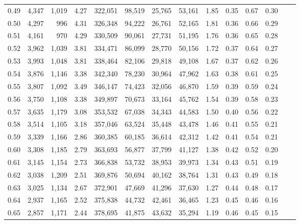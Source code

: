 \begin{tabular}{rrrrrrrrrrrrrr}
0.49 &  4,347 &  1,019 &    4.27 &  322,051 &   98,519 &  25,765 &  53,161 &  1.85 &  0.35 &  0.67 &      0.30 \\
0.50 &  4,297 &    996 &    4.31 &  326,348 &   94,222 &  26,761 &  52,165 &  1.81 &  0.36 &  0.66 &      0.29 \\
0.51 &  4,161 &    970 &    4.29 &  330,509 &   90,061 &  27,731 &  51,195 &  1.76 &  0.36 &  0.65 &      0.28 \\
0.52 &  3,962 &  1,039 &    3.81 &  334,471 &   86,099 &  28,770 &  50,156 &  1.72 &  0.37 &  0.64 &      0.27 \\
0.53 &  3,993 &  1,048 &    3.81 &  338,464 &   82,106 &  29,818 &  49,108 &  1.67 &  0.37 &  0.62 &      0.26 \\
0.54 &  3,876 &  1,146 &    3.38 &  342,340 &   78,230 &  30,964 &  47,962 &  1.63 &  0.38 &  0.61 &      0.25 \\
0.55 &  3,807 &  1,092 &    3.49 &  346,147 &   74,423 &  32,056 &  46,870 &  1.59 &  0.39 &  0.59 &      0.24 \\
0.56 &  3,750 &  1,108 &    3.38 &  349,897 &   70,673 &  33,164 &  45,762 &  1.54 &  0.39 &  0.58 &      0.23 \\
0.57 &  3,635 &  1,179 &    3.08 &  353,532 &   67,038 &  34,343 &  44,583 &  1.50 &  0.40 &  0.56 &      0.22 \\
0.58 &  3,514 &  1,105 &    3.18 &  357,046 &   63,524 &  35,448 &  43,478 &  1.46 &  0.41 &  0.55 &      0.21 \\
0.59 &  3,339 &  1,166 &    2.86 &  360,385 &   60,185 &  36,614 &  42,312 &  1.42 &  0.41 &  0.54 &      0.21 \\
0.60 &  3,308 &  1,185 &    2.79 &  363,693 &   56,877 &  37,799 &  41,127 &  1.38 &  0.42 &  0.52 &      0.20 \\
0.61 &  3,145 &  1,154 &    2.73 &  366,838 &   53,732 &  38,953 &  39,973 &  1.34 &  0.43 &  0.51 &      0.19 \\
0.62 &  3,038 &  1,209 &    2.51 &  369,876 &   50,694 &  40,162 &  38,764 &  1.31 &  0.43 &  0.49 &      0.18 \\
0.63 &  3,025 &  1,134 &    2.67 &  372,901 &   47,669 &  41,296 &  37,630 &  1.27 &  0.44 &  0.48 &      0.17 \\
0.64 &  2,937 &  1,165 &    2.52 &  375,838 &   44,732 &  42,461 &  36,465 &  1.23 &  0.45 &  0.46 &      0.16 \\
0.65 &  2,857 &  1,171 &    2.44 &  378,695 &   41,875 &  43,632 &  35,294 &  1.19 &  0.46 &  0.45 &      0.15 \\

\end{tabular}
